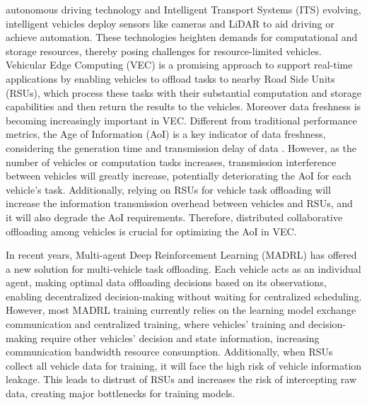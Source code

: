 \documentclass[lettersize,journal,onecolumn]{IEEEtran}
\begin{document}
 autonomous driving technology and Intelligent Transport Systems (ITS) evolving, intelligent vehicles  deploy sensors like cameras and LiDAR to aid driving or achieve automation\cite{ref1,ref32,ref33,ref44}. These technologies heighten demands for computational and storage resources, thereby posing challenges for resource-limited vehicles\cite{ref2,ref34,ref35,ref45}.
Vehicular Edge Computing (VEC) is a promising approach to support real-time applications by enabling vehicles to offload tasks to nearby Road Side Units (RSUs), which process these tasks with their substantial computation and storage capabilities and then return the results to the vehicles\cite{ref3,ref4,ref36,ref46}.
Moreover data freshness is becoming increasingly important in VEC. Different from traditional performance metrics, the Age of Information (AoI) is a key indicator of data freshness, considering the generation time and transmission delay of data \cite{ref1,ref5,ref47}. 
However, as the number of vehicles or computation tasks increases, transmission interference between vehicles will greatly increase, potentially deteriorating the AoI for each vehicle's task\cite{ref6,ref37,ref38}. Additionally, relying on RSUs for  vehicle task offloading will increase the information transmission overhead between vehicles and RSUs, and it will also degrade the AoI requirements. Therefore, distributed collaborative offloading among vehicles is crucial for optimizing the AoI in VEC.
 
In recent years, Multi-agent Deep Reinforcement Learning (MADRL) has offered a new solution for multi-vehicle task offloading\cite{ref7,ref8,}. Each vehicle acts as an individual agent, making optimal data offloading decisions based on its observations, enabling decentralized decision-making without waiting for centralized scheduling.
 However, most MADRL training currently relies on the learning model exchange communication and centralized training, where vehicles' training and decision-making require other vehicles' decision and state information, increasing communication bandwidth resource consumption\cite{ref9,ref10}. Additionally, when RSUs collect all vehicle data for training, it will face the high risk of vehicle information leakage. This leads to distrust of RSUs and increases the risk of intercepting raw data, creating major bottlenecks for training  models\cite{ref11,ref39,ref41}.
\end{document}
